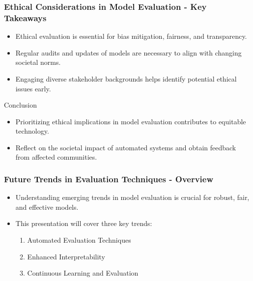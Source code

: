\documentclass[aspectratio=169]{beamer}
\begin{document}
\begin{frame}[fragile]
    \frametitle{Ethical Considerations in Model Evaluation - Key Takeaways}
    \begin{itemize}
        \item Ethical evaluation is essential for bias mitigation, fairness, and transparency.
        \item Regular audits and updates of models are necessary to align with changing societal norms.
        \item Engaging diverse stakeholder backgrounds helps identify potential ethical issues early.
    \end{itemize}

    \begin{block}{Conclusion}
        \begin{itemize}
            \item Prioritizing ethical implications in model evaluation contributes to equitable technology.
            \item Reflect on the societal impact of automated systems and obtain feedback from affected communities.
        \end{itemize}
    \end{block}
\end{frame}

\begin{frame}[fragile]
    \frametitle{Future Trends in Evaluation Techniques - Overview}
    \begin{itemize}
        \item Understanding emerging trends in model evaluation is crucial for robust, fair, and effective models.
        \item This presentation will cover three key trends:
        \begin{enumerate}
            \item Automated Evaluation Techniques
            \item Enhanced Interpretability
            \item Continuous Learning and Evaluation
        \end{enumerate}
    \end{itemize}
\end{frame}
\end{document}
